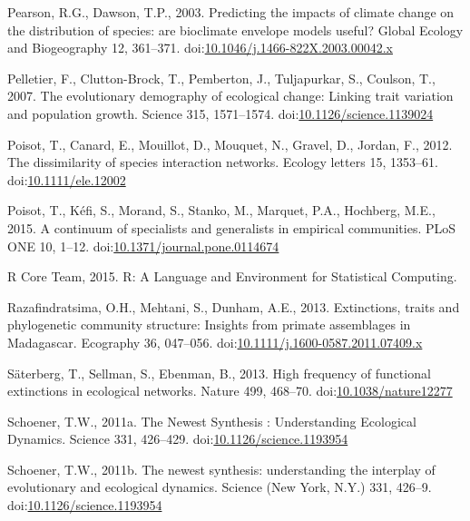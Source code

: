 \hypertarget{ref-Pearson2003}{}
Pearson, R.G., Dawson, T.P., 2003. Predicting the impacts of climate
change on the distribution of species: are bioclimate envelope models
useful? Global Ecology and Biogeography 12, 361--371.
doi:\href{https://doi.org/10.1046/j.1466-822X.2003.00042.x}{10.1046/j.1466-822X.2003.00042.x}

\hypertarget{ref-Pelletier2007}{}
Pelletier, F., Clutton-Brock, T., Pemberton, J., Tuljapurkar, S.,
Coulson, T., 2007. The evolutionary demography of ecological change:
Linking trait variation and population growth. Science 315, 1571--1574.
doi:\href{https://doi.org/10.1126/science.1139024}{10.1126/science.1139024}

\hypertarget{ref-Poisot2012}{}
Poisot, T., Canard, E., Mouillot, D., Mouquet, N., Gravel, D., Jordan,
F., 2012. The dissimilarity of species interaction networks. Ecology
letters 15, 1353--61.
doi:\href{https://doi.org/10.1111/ele.12002}{10.1111/ele.12002}

\hypertarget{ref-Poisot2015c}{}
Poisot, T., Kéfi, S., Morand, S., Stanko, M., Marquet, P.A., Hochberg,
M.E., 2015. A continuum of specialists and generalists in empirical
communities. PLoS ONE 10, 1--12.
doi:\href{https://doi.org/10.1371/journal.pone.0114674}{10.1371/journal.pone.0114674}

\hypertarget{ref-Rcoreteam2015}{}
R Core Team, 2015. R: A Language and Environment for Statistical
Computing.

\hypertarget{ref-Razafindratsima2013}{}
Razafindratsima, O.H., Mehtani, S., Dunham, A.E., 2013. Extinctions,
traits and phylogenetic community structure: Insights from primate
assemblages in Madagascar. Ecography 36, 047--056.
doi:\href{https://doi.org/10.1111/j.1600-0587.2011.07409.x}{10.1111/j.1600-0587.2011.07409.x}

\hypertarget{ref-Saterberg2013}{}
Säterberg, T., Sellman, S., Ebenman, B., 2013. High frequency of
functional extinctions in ecological networks. Nature 499, 468--70.
doi:\href{https://doi.org/10.1038/nature12277}{10.1038/nature12277}

\hypertarget{ref-Schoener2011a}{}
Schoener, T.W., 2011a. The Newest Synthesis : Understanding Ecological
Dynamics. Science 331, 426--429.
doi:\href{https://doi.org/10.1126/science.1193954}{10.1126/science.1193954}

\hypertarget{ref-Schoener2011}{}
Schoener, T.W., 2011b. The newest synthesis: understanding the interplay
of evolutionary and ecological dynamics. Science (New York, N.Y.) 331,
426--9.
doi:\href{https://doi.org/10.1126/science.1193954}{10.1126/science.1193954}

